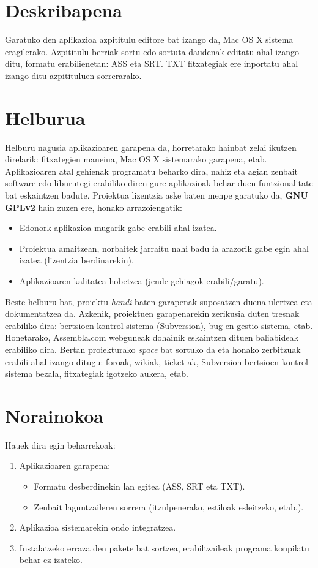 
\section{Deskribapena}
Garatuko den aplikazioa azpititulu editore bat izango da, Mac OS X sistema eragilerako. Azpititulu berriak sortu edo sortuta daudenak editatu ahal izango ditu, formatu erabilienetan: ASS eta SRT. TXT fitxategiak ere inportatu ahal izango ditu azpitituluen sorrerarako.

\section{Helburua}
Helburu nagusia aplikazioaren garapena da, horretarako hainbat zelai ikutzen direlarik: fitxategien maneiua, Mac OS X sistemarako garapena, etab.
Aplikazioaren atal gehienak programatu beharko dira, nahiz eta agian zenbait software edo liburutegi erabiliko diren gure aplikazioak behar duen funtzionalitate bat eskaintzen badute.
Proiektua lizentzia aske baten menpe garatuko da, \textbf{GNU GPLv2} hain zuzen ere, honako arrazoiengatik:
\begin{itemize}
\item Edonork aplikazioa mugarik gabe erabili ahal izatea.
\item Proiektua amaitzean, norbaitek jarraitu nahi badu ia arazorik gabe egin ahal izatea (lizentzia berdinarekin).
\item Aplikazioaren kalitatea hobetzea (jende gehiagok erabili/garatu).
\end{itemize}
Beste helburu bat, proiektu \textit{handi} baten garapenak suposatzen duena ulertzea eta dokumentatzea da.
Azkenik, proiektuen garapenarekin zerikusia duten tresnak erabiliko dira: bertsioen kontrol sistema (Subversion), bug-en gestio sistema, etab. Honetarako, Assembla.com webguneak dohainik eskaintzen dituen baliabideak erabiliko dira. Bertan proiekturako \textit{space} bat sortuko da eta honako zerbitzuak erabili ahal izango ditugu: foroak, wikiak, ticket-ak, Subversion bertsioen kontrol sistema bezala, fitxategiak igotzeko aukera, etab.

\section{Norainokoa}
Hauek dira egin beharrekoak:
\begin{enumerate}
\item Aplikazioaren garapena:
	\begin{itemize}
	\item Formatu desberdinekin lan egitea (ASS, SRT eta TXT).
	\item Zenbait laguntzaileren sorrera (itzulpenerako, estiloak esleitzeko, etab.).
	\end{itemize}
\item Aplikazioa sistemarekin ondo integratzea.
\item Instalatzeko erraza den pakete bat sortzea, erabiltzaileak programa konpilatu behar ez izateko.
\end{enumerate}

